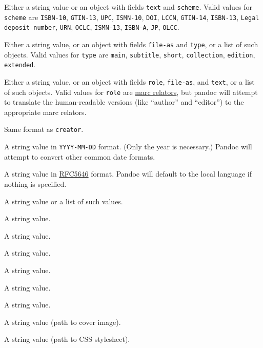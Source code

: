 \documentclass[]{article}
\begin{document}
\begin{description}
\itemsep1pt\parskip0pt
\item[\texttt{identifier}]
Either a string value or an object with fields \texttt{text} and
\texttt{scheme}. Valid values for \texttt{scheme} are \texttt{ISBN-10},
\texttt{GTIN-13}, \texttt{UPC}, \texttt{ISMN-10}, \texttt{DOI},
\texttt{LCCN}, \texttt{GTIN-14}, \texttt{ISBN-13},
\texttt{Legal deposit number}, \texttt{URN}, \texttt{OCLC},
\texttt{ISMN-13}, \texttt{ISBN-A}, \texttt{JP}, \texttt{OLCC}.
\item[\texttt{title}]
Either a string value, or an object with fields \texttt{file-as} and
\texttt{type}, or a list of such objects. Valid values for \texttt{type}
are \texttt{main}, \texttt{subtitle}, \texttt{short},
\texttt{collection}, \texttt{edition}, \texttt{extended}.
\item[\texttt{creator}]
Either a string value, or an object with fields \texttt{role},
\texttt{file-as}, and \texttt{text}, or a list of such objects. Valid
values for \texttt{role} are
\href{http://www.loc.gov/marc/relators/relaterm.html}{marc relators},
but pandoc will attempt to translate the human-readable versions (like
``author'' and ``editor'') to the appropriate marc relators.
\item[\texttt{contributor}]
Same format as \texttt{creator}.
\item[\texttt{date}]
A string value in \texttt{YYYY-MM-DD} format. (Only the year is
necessary.) Pandoc will attempt to convert other common date formats.
\item[\texttt{language}]
A string value in \href{http://tools.ietf.org/html/rfc5646}{RFC5646}
format. Pandoc will default to the local language if nothing is
specified.
\item[\texttt{subject}]
A string value or a list of such values.
\item[\texttt{description}]
A string value.
\item[\texttt{type}]
A string value.
\item[\texttt{format}]
A string value.
\item[\texttt{relation}]
A string value.
\item[\texttt{coverage}]
A string value.
\item[\texttt{rights}]
A string value.
\item[\texttt{cover-image}]
A string value (path to cover image).
\item[\texttt{stylesheet}]
A string value (path to CSS stylesheet).
\end{description}
\end{document}
